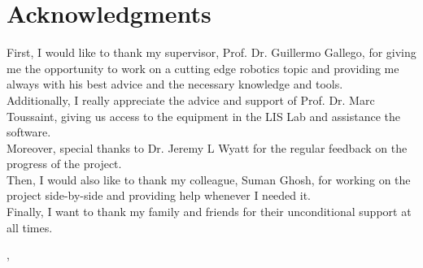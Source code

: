 \chapter*{Acknowledgments}

First, I would like to thank my supervisor, Prof. Dr. Guillermo Gallego, for giving me the opportunity to work on a cutting edge robotics topic and providing me always with his best advice and the necessary knowledge and tools.\\

Additionally, I really appreciate the advice and support of Prof. Dr. Marc Toussaint, giving us access to the equipment in the LIS Lab and assistance the software.\\

Moreover, special thanks to Dr. Jeremy L Wyatt for the regular feedback on the progress of the project.\\

Then, I would also like to thank my colleague, Suman Ghosh, for working on the project side-by-side and providing help whenever I needed it.\\

Finally, I want to thank my family and friends for their unconditional support at all times.

\vspace{0.5in}
\begin{flushright}
  \metaCity, \metaDate
\end{flushright}

